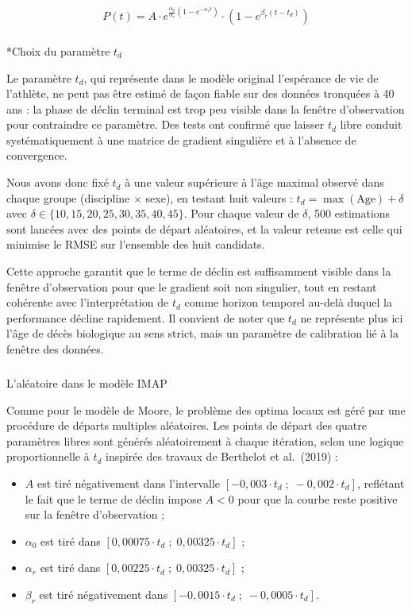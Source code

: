 \documentclass[
  french,
  11pt,
  a4paper,
]{article}
\makeatletter
\let\oldsubparagraph\subparagraph
\renewcommand{\subparagraph}{
    \@ifstar
      \xxxSubParagraphStar
      \xxxSubParagraphNoStar
  }
\newcommand{\xxxSubParagraphStar}[1]{\oldsubparagraph*{#1}\mbox{}}
\newcommand{\xxxSubParagraphNoStar}[1]{\oldsubparagraph{#1}\mbox{}}
\makeatother
\begin{document}
\[P(t) = A \cdot e^{\frac{\alpha_0}{\alpha_r}(1 - e^{-\alpha_r t})}
\cdot \left(1 - e^{\beta_r(t - t_d)}\right)\]

\subparagraph*{\texorpdfstring{Choix du paramètre
\(t_d\)}{Choix du paramètre t\_d}}\label{choix-du-paramuxe8tre-t_d}

Le paramètre \(t_d\), qui représente dans le modèle original l'espérance
de vie de l'athlète, ne peut pas être estimé de façon fiable sur des
données tronquées à 40 ans : la phase de déclin terminal est trop peu
visible dans la fenêtre d'observation pour contraindre ce paramètre. Des
tests ont confirmé que laisser \(t_d\) libre conduit systématiquement à
une matrice de gradient singulière et à l'absence de convergence.

Nous avons donc fixé \(t_d\) à une valeur supérieure à l'âge maximal
observé dans chaque groupe (discipline \(\times\) sexe), en testant huit
valeurs : \(t_d = \max(\text{Age}) + \delta\) avec
\(\delta \in \{10, 15, 20, 25, 30,
35, 40, 45\}\). Pour chaque valeur de \(\delta\), 500 estimations sont
lancées avec des points de départ aléatoires, et la valeur retenue est
celle qui minimise le RMSE sur l'ensemble des huit candidats.

Cette approche garantit que le terme de déclin est suffisamment visible
dans la fenêtre d'observation pour que le gradient soit non singulier,
tout en restant cohérente avec l'interprétation de \(t_d\) comme horizon
temporel au-delà duquel la performance décline rapidement. Il convient
de noter que \(t_d\) ne représente plus ici l'âge de décès biologique au
sens strict, mais un paramètre de calibration lié à la fenêtre des
données.

\subparagraph{L'aléatoire dans le modèle
IMAP}\label{laluxe9atoire-dans-le-moduxe8le-imap}

Comme pour le modèle de Moore, le problème des optima locaux est géré
par une procédure de départs multiples aléatoires. Les points de départ
des quatre paramètres libres sont générés aléatoirement à chaque
itération, selon une logique proportionnelle à \(t_d\) inspirée des
travaux de Berthelot et al.~(2019) :

\begin{itemize}
  \item $A$ est tiré négativement dans l'intervalle
        $[-0{,}003 \cdot t_d \;;\; -0{,}002 \cdot t_d]$,
        reflétant le fait que le terme de déclin impose $A < 0$ pour que
        la courbe reste positive sur la fenêtre d'observation ;
  \item $\alpha_0$ est tiré dans
        $[0{,}00075 \cdot t_d \;;\; 0{,}00325 \cdot t_d]$ ;
  \item $\alpha_r$ est tiré dans
        $[0{,}00225 \cdot t_d \;;\; 0{,}00325 \cdot t_d]$ ;
  \item $\beta_r$ est tiré négativement dans
        $[-0{,}0015 \cdot t_d \;;\; -0{,}0005 \cdot t_d]$.
\end{itemize}
\end{document}

